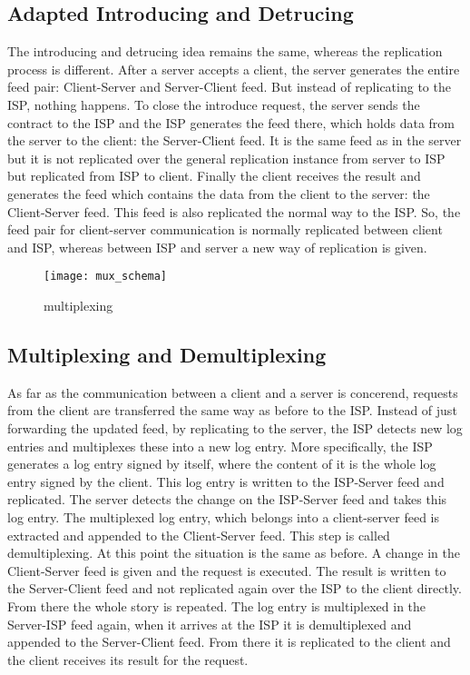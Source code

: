 \subsection{Adapted Introducing and Detrucing}
The introducing and detrucing idea remains the same, whereas the replication process is different. After a server accepts a client, the server generates the entire feed pair: Client-Server and Server-Client feed. But instead of replicating to the ISP, nothing happens. To close the introduce request, the server sends the contract to the ISP and the ISP generates the feed there, which holds data from the server to the client: the Server-Client feed. It is the same feed as in the server but it is not replicated over the general replication instance from server to ISP but replicated from ISP to client. Finally the client receives the result and generates the feed which contains the data from the client to the server: the Client-Server feed. This feed is also replicated the normal way to the ISP. So, the feed pair for client-server communication is normally replicated between client and ISP, whereas between ISP and server a new way of replication is given.

\begin{figure}
    \centering
    \texttt{[image: mux\_schema]}
    \caption{multiplexing}
    \label{fig:mux}
\end{figure}

\subsection{Multiplexing and Demultiplexing}
As far as the communication between a client and a server is concerend, requests from the client are transferred the same way as before to the ISP. Instead of just forwarding the updated feed, by replicating to the server, the ISP detects new log entries and multiplexes these into a new log entry.
More specifically, the ISP generates a log entry signed by itself, where the content of it is the whole log entry signed by the client. This log entry is written to the ISP-Server feed and replicated. The server detects the change on the ISP-Server feed and takes this log entry. The multiplexed log entry, which belongs into a client-server feed is extracted and appended to the Client-Server feed. This step is called demultiplexing. At this point the situation is the same as before. A change in the Client-Server feed is given and the request is executed. The result is written to the Server-Client feed and not replicated again over the ISP to the client directly. From there the whole story is repeated. The log entry is  multiplexed in the Server-ISP feed again, when it arrives at the ISP it is demultiplexed and appended to the Server-Client feed. From there it is replicated to the client and the client receives its result for the request.

